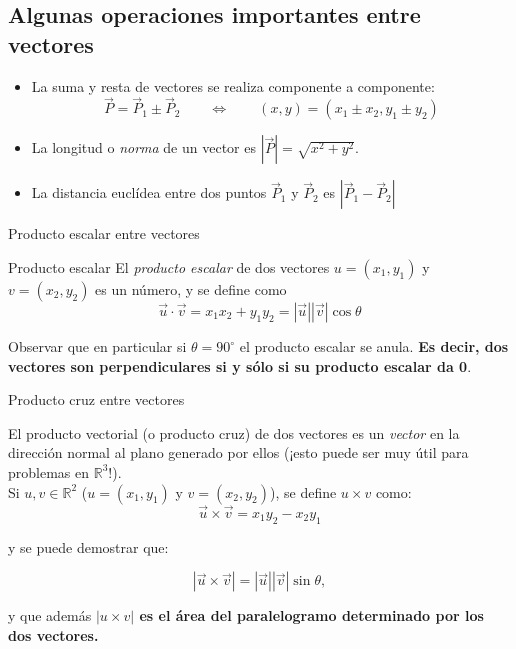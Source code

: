 \documentclass[compress]{beamer}
\newcommand{\be}{\begin{equation*}}
\newcommand{\ee}{\end{equation*}}
\begin{document}
\subsection{Algunas operaciones importantes entre vectores}

\begin{frame}
\begin{itemize}
\item La suma y resta de vectores se realiza componente a componente:
    \be
    \vec{P} = \vec{P}_1 \pm \vec{P}_2  \qquad \Longleftrightarrow \qquad (x, y) = (x_1 \pm x_2, y_1 \pm y_2)
    \ee
    \vspace{0.25cm}
    \item La longitud o \emph{norma} de un vector es $|\vec{P}| = \sqrt{x^2 + y^2}$.
\vspace{0.25cm}
    \item La distancia eucl\'idea entre dos puntos $\vec{P}_1$ y $\vec{P}_2$ es $|\vec{P}_1 - \vec{P}_2|$
\end{itemize}
\end{frame}

\begin{frame}{Producto escalar entre vectores}

\begin{block}{Producto escalar}
El \emph{producto escalar} de dos vectores $u = (x_1,y_1)$ y $v = (x_2,y_2)$ es un n\'umero, y se define como
    \be
    \vec{u} \cdot \vec{v} = x_1 x_2 + y_1 y_2 = |\vec{u}| |\vec{v}| \cos\theta
    \ee
\end{block}
%
    Observar que en particular si $\theta = 90^\circ$ el producto escalar se anula.
\textbf{Es decir, dos vectores son perpendiculares si y s\'olo si su producto escalar da 0}.

\end{frame}

\begin{frame}{Producto cruz entre vectores}

El producto vectorial (o producto cruz) de dos vectores es un \emph{vector} en la direcci\'on normal al plano generado por ellos (¡esto puede ser muy \'util para problemas en $\mathbb{R}^3$!). \\

Si $u,v \in \mathbb{R}^2$ ($u = (x_1,y_1)$ y $v = (x_2,y_2)$), se define $u \times v$ como:
\be
   \vec{u} \times \vec{v} = x_1 y_2 - x_2 y_1
\ee

y se puede demostrar que:

\be
    |\vec{u} \times \vec{v}| = |\vec{u}| |\vec{v}| \sin\theta,
\ee

y que adem\'as \textbf{ $|u \times v|$ es el \'area del paralelogramo determinado por los dos vectores.}

\end{frame}
\end{document}
